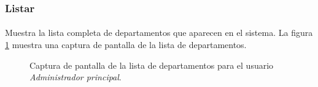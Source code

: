 \subsubsection{Listar}

  \paragraph{}Muestra la lista completa de departamentos que aparecen en el
  sistema. La figura
  \ref{capturaPantallaListaDepartamentosAdminPrincipal} muestra una
  captura de pantalla de la lista de departamentos.

  \begin{figure}[!ht]
    \begin{center}
      \caption{Captura de pantalla de la lista de departamentos para el usuario \textit{Administrador principal}.}
      \label{capturaPantallaListaDepartamentosAdminPrincipal}
    \end{center}
  \end{figure}
